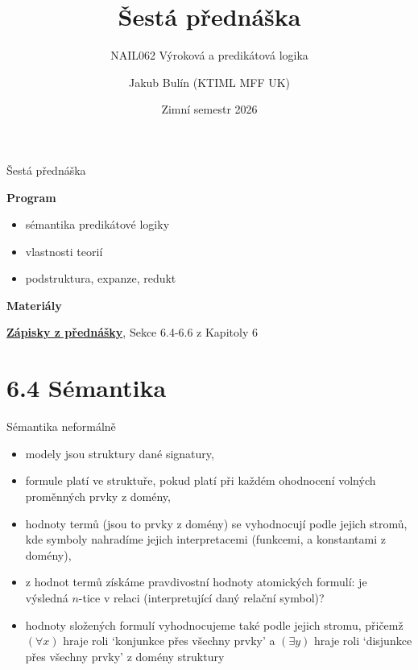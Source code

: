 \documentclass{beamer}
\title{Šestá přednáška}
\subtitle{NAIL062 Výroková a predikátová logika}
\author{Jakub Bulín (KTIML MFF UK)}
\date{Zimní semestr 2026}
\begin{document}
\maketitle


\begin{frame}{Šestá přednáška}

    \textbf{Program}
        \begin{itemize}
            \item sémantika predikátové logiky 
            \item vlastnosti teorií
            \item podstruktura, expanze, redukt
            
        \end{itemize}

    \textbf{Materiály}

        \href{https://github.com/jbulin-mff-uk/nail062/raw/main/lecture/lecture-notes/lecture-notes.pdf}{\alert{\textbf{Zápisky z přednášky}}}, Sekce 6.4-6.6 z Kapitoly 6

\end{frame}


\section{6.4 Sémantika}


\begin{frame}{Sémantika neformálně}

    \begin{itemize}[<+->]
        \item \alert{modely jsou struktury} dané signatury,
        \item formule \alert{platí} ve struktuře, pokud platí při každém ohodnocení volných proměnných prvky z domény,
        \item \alert{hodnoty termů} (jsou to prvky z domény) se vyhodnocují podle jejich stromů, kde symboly nahradíme jejich interpretacemi (funkcemi, a konstantami z domény),
        \item z hodnot termů získáme \alert{pravdivostní hodnoty atomických formulí}: je výsledná $n$-tice v relaci (interpretující daný relační symbol)?
        \item hodnoty složených formulí vyhodnocujeme také podle jejich stromu, přičemž \alert{$(\forall x)$ hraje roli `konjunkce přes všechny prvky'} a  \alert{$(\exists y)$ hraje roli `disjunkce přes všechny prvky'} z domény struktury
    \end{itemize}

\end{frame}
\end{document}
